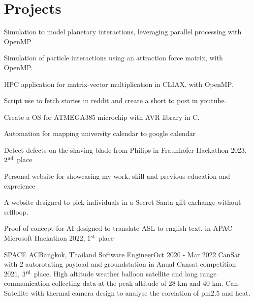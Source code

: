\section{Projects}
\resumeSubHeadingListStart

{Simulation to model planetary interactions, leveraging parallel processing with OpenMP}

{Simulation of particle interactions using an attraction force matrix, with OpenMP.}

{HPC application for matrix-vector multiplication in CLIAX, with OpenMP.}

{Script use to fetch stories in reddit and create a short to post in youtube.}

{Create a OS for ATMEGA385 microchip with AVR library in C.}

{Automation for mapping university calendar to google calendar}

{Detect defects on the shaving blade from Philips in Fraunhofer Hackathon 2023, $2\textsuperscript{nd}$ place}

{Personal website for showcasing my work, skill and previous education and expreience}

{A website designed to pick individuals in a Secret Santa gift exchange without selfloop.}

{Proof of concept for AI designed to translate ASL to english text. in APAC Microsoft Hackathon 2022, $1\textsuperscript{st}$ place}

\resumeSubheading
{SPACE AC}{Bangkok, Thailand}
{Software Engineer}{Oct 2020 - Mar 2022}
\resumeItemListStart
{}
{CanSat with 2 autorotating payload and groundstation in Anual Cansat competition 2021, $3\textsuperscript{rd}$ place.}
{High altitude weather balloon satellite and long range communication collecting data at the peak altitude of 28 km and 40 km.}
{Can-Satellite with thermal camera design to analyse the corelation of pm2.5 and heat.}
\resumeItemListEnd
\resumeSubHeadingListEnd
